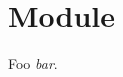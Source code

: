\section{Module }\label{module-External}%
\label{module-External-val-foo}\begin{ocamlindent}Foo \emph{bar}.\end{ocamlindent}%
\medbreak


